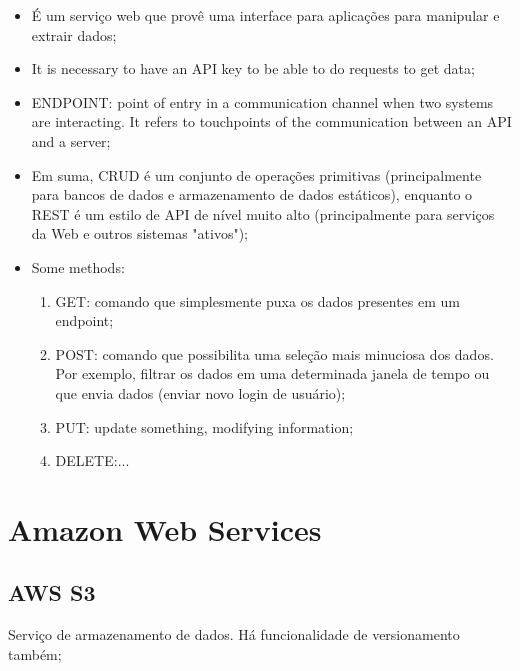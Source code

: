 \begin{itemize}
    \item É um serviço web que provê uma interface para aplicações para manipular e extrair dados;
    \item It is necessary to have an API key to be able to do requests to get data;
    \item ENDPOINT: point of entry in a communication channel when two systems are interacting. It refers to touchpoints of the communication between an API and a server;
    \item Em suma, CRUD é um conjunto de operações primitivas (principalmente para bancos de dados e armazenamento de dados estáticos), enquanto o REST é um estilo de API de nível muito alto (principalmente para serviços da Web e outros sistemas "ativos");
    \item Some methods:
    \begin{enumerate}
        \item GET: comando que simplesmente puxa os dados presentes em um endpoint;
        \item POST: comando que possibilita uma seleção mais minuciosa dos dados. Por exemplo, filtrar os dados em uma determinada janela de tempo ou que envia dados (enviar novo login de usuário);
        \item PUT: update something, modifying information;
        \item DELETE:...
    \end{enumerate}
\end{itemize}

\section{Amazon Web Services}
\subsection{AWS S3}
Serviço de armazenamento de dados. Há funcionalidade de versionamento também;


